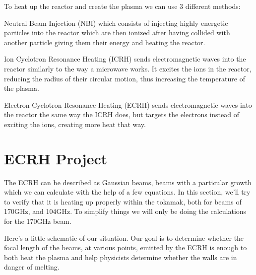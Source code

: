 \documentclass[11pt, openright]{book}
\begin{document}
\tab To heat up the reactor and create the plasma we can use 3 different methods:
\begin{items}{-15pt}{-15pt}
    \item Neutral Beam Injection (NBI) which consists of injecting highly energetic particles into the reactor which are then ionized after having collided with another particle giving them their energy and heating the reactor.
    \item Ion Cyclotron Resonance Heating (ICRH) sends electromagnetic waves into the reactor similarly to the way a microwave works. It excites the ions in the reactor, reducing the radius of their circular motion, thus increasing the temperature of the plasma.
    \item Electron Cyclotron Resonance Heating (ECRH) sends electromagnetic waves into the reactor the same way the ICRH does, but targets the electrons instead of exciting the ions, creating more heat that way.
\end{items}



\newpage

\section{ECRH Project}

\tab The ECRH can be described as Gaussian beams, beams with a particular growth which we can calculate with the help of a few equations. In this section, we’ll try to verify that it is heating up properly within the tokamak, both for beams of 170GHz, and 104GHz. To simplify things we will only be doing the calculations for the 170GHz beam.

\tab Here's a little schematic of our situation. Our goal is to determine whether the focal length of the beams, at various points, emitted by the ECRH is enough to both heat the plasma and help physicists determine whether the walls are in danger of melting.
\end{document}
